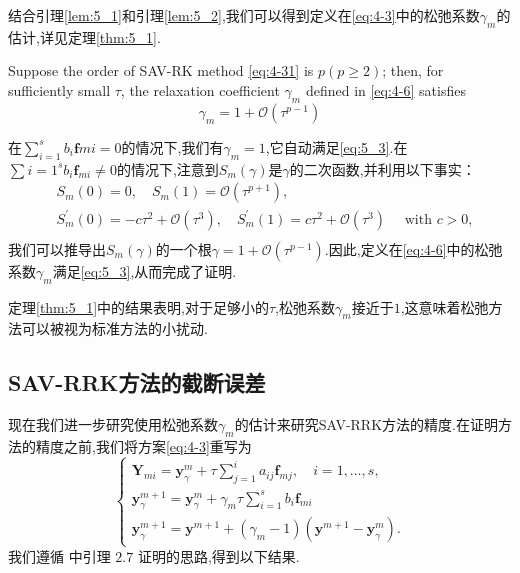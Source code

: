 结合引理\ref{lem:5_1}和引理\ref{lem:5_2},我们可以得到定义在\eqref{eq:4-3}中的松弛系数$\gamma_m$的估计,详见定理\ref{thm:5_1}.

\begin{thm}\label{thm:5_1}
	Suppose the order of SAV-RK method \eqref{eq:4-31} is $p(p \geq 2)$; then, for sufficiently small $\tau$, the relaxation coefficient $\gamma_m$ defined in \eqref{eq:4-6} satisfies
\begin{equation}\label{eq:5_3}
\gamma_m=1+\mathcal{O}\left(\tau^{p-1}\right)
\end{equation}
\end{thm} 
\begin{pf}
	在$\sum_{i=1}^s b_i \bm{f}{m i}=0$的情况下,我们有$\gamma_m=1$,它自动满足\eqref{eq:5_3}.在$\sum{i=1}^s b_i \bm{f}_{m i}\neq 0$的情况下,注意到$S_m(\gamma)$是$\gamma$的二次函数,并利用以下事实：
    \begin{equation}
\begin{aligned}
& S_m(0)=0, \quad S_m(1)=\mathcal{O}\left(\tau^{p+1}\right), \\
& S_m^{\prime}(0)=-c \tau^2+\mathcal{O}\left(\tau^3\right), \quad S_m^{\prime}(1)=c \tau^2+\mathcal{O}\left(\tau^3\right) \quad \text { with } c>0, \\
&
\end{aligned}
\end{equation}
我们可以推导出$S_m(\gamma)$的一个根$\gamma=1+\mathcal{O}\left(\tau^{p-1}\right)$.因此,定义在\eqref{eq:4-6}中的松弛系数$\gamma_m$满足\eqref{eq:5_3},从而完成了证明.
\end{pf}
\begin{remark}\label{rk:5_1}
	定理\ref{thm:5_1}中的结果表明,对于足够小的$\tau$,松弛系数$\gamma_m$接近于$1$,这意味着松弛方法可以被视为标准方法的小扰动.
\end{remark}
\subsection{SAV-RRK方法的截断误差}
现在我们进一步研究使用松弛系数$\gamma_m$的估计来研究SAV-RRK方法的精度.在证明方法的精度之前,我们将方案\eqref{eq:4-3}重写为
\begin{equation}
	\left\{\begin{array}{l}
		\bm{Y}_{m i}=\bm{y}_\gamma^m+\tau \sum\limits_{j=1}^i a_{i j} \bm{f}_{m j}, \quad i=1, \ldots, s, \\
		\bm{y}_\gamma^{m+1}=\bm{y}_\gamma^m+\gamma_m \tau \sum\limits_{i=1}^s b_i \bm{f}_{m i}\\
		\bm{y}_\gamma^{m+1}=\bm{y}^{m+1}+\left(\gamma_m-1\right)\left(\bm{y}^{m+1}-\bm{y}_\gamma^m\right) .
	\end{array}\right.\label{eq:4-321}
	\end{equation}
    我们遵循 \cite{ranochaGeneralRelaxationMethods2020} 中引理 $2.7$ 证明的思路,得到以下结果.

